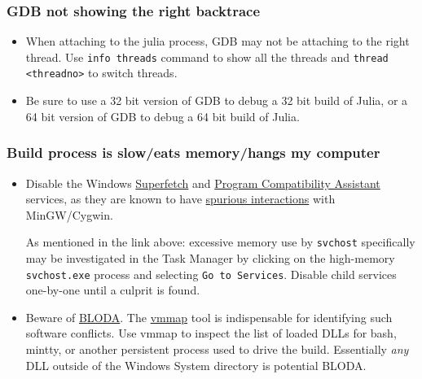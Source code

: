 \hypertarget{8463982529066496058}{}


\subsubsection{GDB not showing the right backtrace}



\begin{itemize}
\item When attaching to the julia process, GDB may not be attaching to the right thread.  Use \texttt{info threads} command to show all the threads and \texttt{thread <threadno>} to switch threads.


\item Be sure to use a 32 bit version of GDB to debug a 32 bit build of Julia, or a 64 bit version of GDB to debug a 64 bit build of Julia.

\end{itemize}


\hypertarget{8099613672189184632}{}


\subsubsection{Build process is slow/eats memory/hangs my computer}



\begin{itemize}
\item Disable the Windows \href{https://en.wikipedia.org/wiki/Windows\_Vista\_I/O\_technologies\#SuperFetch}{Superfetch} and \href{https://blogs.msdn.com/b/cjacks/archive/2011/11/22/managing-the-windows-7-program-compatibility-assistant-pca.aspx}{Program Compatibility Assistant} services, as they are known to have \href{https://cygwin.com/ml/cygwin/2011-12/msg00058.html}{spurious interactions} with MinGW/Cygwin.

As mentioned in the link above: excessive memory use by \texttt{svchost} specifically may be investigated in the Task Manager by clicking on the high-memory \texttt{svchost.exe} process and selecting \texttt{Go to Services}. Disable child services one-by-one until a culprit is found.


\item Beware of \href{https://cygwin.com/faq/faq.html\#faq.using.bloda}{BLODA}. The \href{https://technet.microsoft.com/en-us/sysinternals/dd535533.aspx}{vmmap} tool is indispensable for identifying such software conflicts. Use vmmap to inspect the list of loaded DLLs for bash, mintty, or another persistent process used to drive the build. Essentially \emph{any} DLL outside of the Windows System directory is potential BLODA.

\end{itemize}


